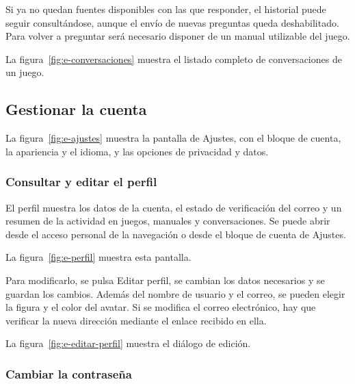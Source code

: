 Si ya no quedan fuentes disponibles con las que responder, el historial
puede seguir consultándose, aunque el envío de nuevas preguntas queda
deshabilitado. Para volver a preguntar será necesario disponer de un manual
utilizable del juego.

La figura~\ref{fig:e-conversaciones} muestra el listado completo de
conversaciones de un juego.



\subsection{Gestionar la cuenta}
\label{sec:e-cuenta}

La figura~\ref{fig:e-ajustes} muestra la pantalla de \guillemotleft{}Ajustes\guillemotright{}, con
el bloque de cuenta, la apariencia y el idioma, y las opciones de privacidad
y datos.


\subsubsection{Consultar y editar el perfil}

El perfil muestra los datos de la cuenta, el estado de verificación del
correo y un resumen de la actividad en juegos, manuales y conversaciones.
Se puede abrir desde el acceso personal de la navegación o desde el bloque
de cuenta de \guillemotleft{}Ajustes\guillemotright{}.

La figura~\ref{fig:e-perfil} muestra esta pantalla.


Para modificarlo, se pulsa \guillemotleft{}Editar perfil\guillemotright{},
se cambian los datos necesarios y se guardan los cambios. Además del nombre
de usuario y el correo, se pueden elegir la figura y el color del avatar.
Si se modifica el correo electrónico, hay que verificar la nueva dirección
mediante el enlace recibido en ella.

La figura~\ref{fig:e-editar-perfil} muestra el diálogo de edición.


\subsubsection{Cambiar la contraseña}

